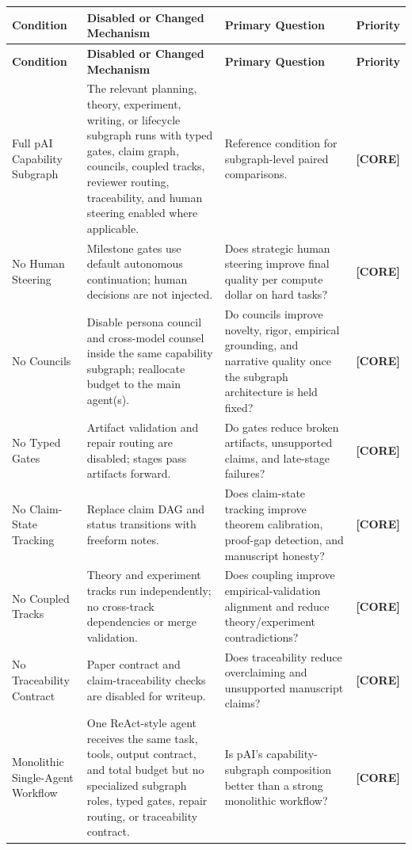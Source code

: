 \documentclass[11pt]{article}
\newcommand{\core}{\textbf{\textcolor{green!45!black}{[CORE]}}}
\newcommand{\pai}{pAI}
\begin{document}
\begin{longtable}{>{\raggedright\arraybackslash}p{} >{\raggedright\arraybackslash}p{} >{\raggedright\arraybackslash}p{} >{\raggedright\arraybackslash}p{}}
\toprule
\textbf{Condition} & \textbf{Disabled or Changed Mechanism} & \textbf{Primary Question} & \textbf{Priority} \\
\midrule
\endfirsthead
\toprule
\textbf{Condition} & \textbf{Disabled or Changed Mechanism} & \textbf{Primary Question} & \textbf{Priority} \\
\midrule
\endhead
Full \pai{} Capability Subgraph & The relevant planning, theory, experiment, writing, or lifecycle subgraph runs with typed gates, claim graph, councils, coupled tracks, reviewer routing, traceability, and human steering enabled where applicable. & Reference condition for subgraph-level paired comparisons. & \core{} \\
No Human Steering & Milestone gates use default autonomous continuation; human decisions are not injected. & Does strategic human steering improve final quality per compute dollar on hard tasks? & \core{} \\
No Councils & Disable persona council and cross-model counsel inside the same capability subgraph; reallocate budget to the main agent(s). & Do councils improve novelty, rigor, empirical grounding, and narrative quality once the subgraph architecture is held fixed? & \core{} \\
No Typed Gates & Artifact validation and repair routing are disabled; stages pass artifacts forward. & Do gates reduce broken artifacts, unsupported claims, and late-stage failures? & \core{} \\
No Claim-State Tracking & Replace claim DAG and status transitions with freeform notes. & Does claim-state tracking improve theorem calibration, proof-gap detection, and manuscript honesty? & \core{} \\
No Coupled Tracks & Theory and experiment tracks run independently; no cross-track dependencies or merge validation. & Does coupling improve empirical-validation alignment and reduce theory/experiment contradictions? & \core{} \\
No Traceability Contract & Paper contract and claim-traceability checks are disabled for writeup. & Does traceability reduce overclaiming and unsupported manuscript claims? & \core{} \\
Monolithic Single-Agent Workflow & One ReAct-style agent receives the same task, tools, output contract, and total budget but no specialized subgraph roles, typed gates, repair routing, or traceability contract. & Is \pai{}'s capability-subgraph composition better than a strong monolithic workflow? & \core{} \\

\end{longtable}
\end{document}
